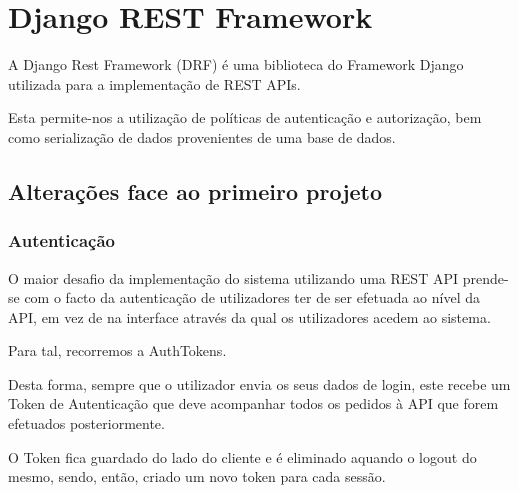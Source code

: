 \documentclass[12pt]{article}
\begin{document}
\section{Django REST Framework}

A Django Rest Framework (DRF) é uma biblioteca do Framework Django utilizada para a implementação de REST APIs. 
\par Esta permite-nos a utilização de políticas de autenticação e autorização, bem como serialização de dados provenientes de uma base de dados.

\subsection{Alterações face ao primeiro projeto}
\subsubsection{Autenticação}
O maior desafio da implementação do sistema utilizando uma REST API prende-se com o facto da autenticação de utilizadores ter de ser efetuada ao nível da API, em vez de na interface através da qual os utilizadores acedem ao sistema.
\par Para tal, recorremos a AuthTokens.
\par Desta forma, sempre que o utilizador envia os seus dados de login, este recebe um Token de Autenticação que deve acompanhar todos os pedidos à API que forem efetuados posteriormente.
\par O Token fica guardado do lado do cliente e é eliminado aquando o logout do mesmo, sendo, então, criado um novo token para cada sessão.

\vspace{8mm}
\end{document}
